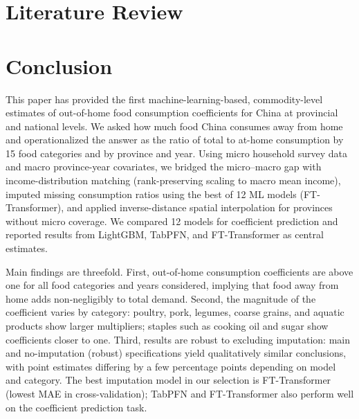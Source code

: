 \documentclass[12pt,a4paper]{article}
\begin{document}
\section{Literature Review}
\label{sec:literature}











\section{Conclusion}
\label{sec:conclusion}

This paper has provided the first machine-learning-based, commodity-level estimates of out-of-home food consumption coefficients for China at provincial and national levels. We asked how much food China consumes away from home and operationalized the answer as the ratio of total to at-home consumption by 15 food categories and by province and year. Using micro household survey data and macro province-year covariates, we bridged the micro--macro gap with income-distribution matching (rank-preserving scaling to macro mean income), imputed missing consumption ratios using the best of 12 ML models (FT-Transformer), and applied inverse-distance spatial interpolation for provinces without micro coverage. We compared 12 models for coefficient prediction and reported results from LightGBM, TabPFN, and FT-Transformer as central estimates.

Main findings are threefold. First, out-of-home consumption coefficients are above one for all food categories and years considered, implying that food away from home adds non-negligibly to total demand. Second, the magnitude of the coefficient varies by category: poultry, pork, legumes, coarse grains, and aquatic products show larger multipliers; staples such as cooking oil and sugar show coefficients closer to one. Third, results are robust to excluding imputation: main and no-imputation (robust) specifications yield qualitatively similar conclusions, with point estimates differing by a few percentage points depending on model and category. The best imputation model in our selection is FT-Transformer (lowest MAE in cross-validation); TabPFN and FT-Transformer also perform well on the coefficient prediction task.
\end{document}
